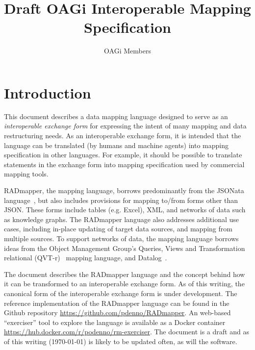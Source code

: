 \documentclass[9pt,letterpaper]{article}
\begin{document}
\title{Draft OAGi Interoperable Mapping Specification}
\author{OAGi Members}
\maketitle

\section{Introduction}
This document describes a data mapping language designed to serve as an \textit{interoperable exchange form} for expressing the intent of many mapping and data restructuring needs.
As an interoperable exchange form, it is intended that the language can be translated (by humans and machine agents) into mapping specification in other languages.
For example, it should be possible to translate statements in the exchange form into mapping specification used by commercial mapping tools.

RADmapper, the mapping language, borrows predominantly from the JSONata language~\cite{Jsonata.org2021}, but also includes provisions for mapping to/from forms other than JSON.\@
These forms include tables (e.g. Excel), XML, and networks of data such as knowledge graphs.
The RADmapper language also addresses additional use cases, including in-place updating of target data sources, and mapping from multiple sources.
To support networks of data, the mapping language borrows ideas from the Object Management Group's Queries, Views and Transformation relational (QVT-r)~\cite{ObjectManagementGroup2016b} mapping language, and Datalog~\cite{Abiteboul1995a}.

The document describes the RADmapper language and the concept behind how it can be transformed to an interoperable exchange form.
As of this writing, the canonical form of the interoperable exchange form is under development.
The reference implementation of the RADmapper language can be found in the Github repository \href{https://github.com/pdenno/RADmapper}{https://github.com/pdenno/RADmapper}.
An web-based ``exerciser'' tool to explore the language is available as a Docker container
\href{https://hub.docker.com/r/podenno/rm-exerciser}{https://hub.docker.com/r/podenno/rm-exerciser}.
The document is a draft and as of this writing (\today) is likely to be updated often, as will the software.
\end{document}
